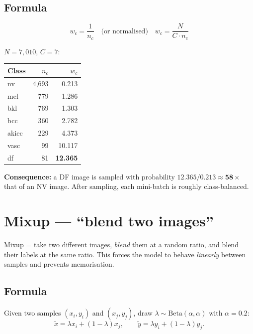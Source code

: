 \documentclass[11pt,a4paper]{article}
\begin{document}
\subsection{Formula}

\[
  w_c = \frac{1}{n_c} \quad \text{(or normalised)} \quad w_c = \frac{N}{C \cdot n_c}
\]

\begin{example}
$N = 7{,}010$, $C = 7$:

\begin{center}\small
\begin{tabular}{lrr}
\toprule
Class & $n_c$ & $w_c$ \\
\midrule
nv    & 4{,}693 & 0.213 \\
mel   &   779   & 1.286 \\
bkl   &   769   & 1.303 \\
bcc   &   360   & 2.782 \\
akiec &   229   & 4.373 \\
vasc  &    99   & 10.117 \\
df    &    81   & \textbf{12.365} \\
\bottomrule
\end{tabular}
\end{center}

\textbf{Consequence:} a DF image is sampled with probability $12.365 / 0.213 \approx \mathbf{58\times}$ that of an NV image. After sampling, each mini-batch is roughly class-balanced.
\end{example}

\section{Mixup --- ``blend two images''}

\begin{simple}
Mixup = take two different images, \textit{blend} them at a random ratio, and blend their labels at the same ratio. This forces the model to behave \textit{linearly} between samples and prevents memorisation.
\end{simple}

\subsection{Formula}

Given two samples $(x_i, y_i)$ and $(x_j, y_j)$, draw $\lambda \sim \mathrm{Beta}(\alpha, \alpha)$ with $\alpha = 0.2$:
\[
  \tilde{x} = \lambda x_i + (1-\lambda) x_j, \qquad \tilde{y} = \lambda y_i + (1-\lambda) y_j.
\]
\end{document}
